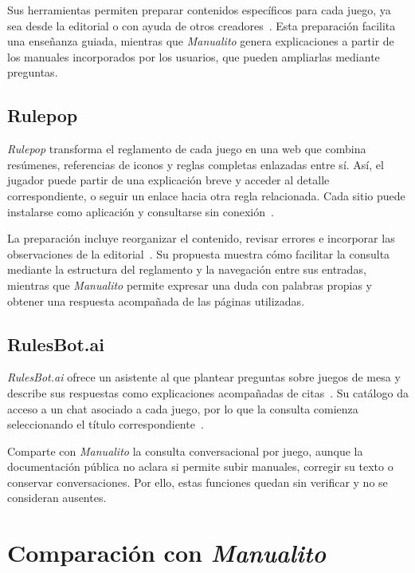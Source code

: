 Sus herramientas permiten preparar contenidos específicos para cada juego,
ya sea desde la editorial o con ayuda de otros
creadores~\cite{dized_funciones}. Esta preparación
facilita una enseñanza guiada, mientras que \textit{Manualito} genera
explicaciones a partir de los manuales incorporados por los usuarios, que
pueden ampliarlas mediante preguntas.

\subsection{Rulepop}
\label{relacionados:rulepop}

\textit{Rulepop} transforma el reglamento de cada juego en una web que
combina resúmenes, referencias de iconos y reglas completas enlazadas entre
sí. Así, el jugador puede partir de una explicación breve y acceder al
detalle correspondiente, o seguir un enlace hacia otra regla relacionada.
Cada sitio puede instalarse como aplicación y consultarse sin
conexión~\cite{rulepop_funciones}.

La preparación incluye reorganizar el contenido, revisar errores e
incorporar las observaciones de la editorial~\cite{rulepop_funciones}.
Su propuesta muestra cómo
facilitar la consulta mediante la estructura del reglamento y la navegación
entre sus entradas, mientras que \textit{Manualito} permite expresar una
duda con palabras propias y obtener una respuesta acompañada de las
páginas utilizadas.

\subsection{RulesBot.ai}
\label{relacionados:rulesbot}

\textit{RulesBot.ai} ofrece un asistente al que plantear preguntas sobre
juegos de mesa y describe sus respuestas como explicaciones acompañadas
de citas~\cite{rulesbot_presentacion}. Su catálogo da acceso a un chat
asociado a cada juego, por lo que la consulta comienza seleccionando el
título correspondiente~\cite{rulesbot_catalogo}.

Comparte con \textit{Manualito} la consulta conversacional por juego,
aunque la documentación pública no aclara si permite subir manuales,
corregir su texto o conservar conversaciones. Por ello, estas funciones
quedan sin verificar y no se consideran ausentes.

\section{Comparación con \textit{Manualito}}
\label{relacionados:comparacion}

